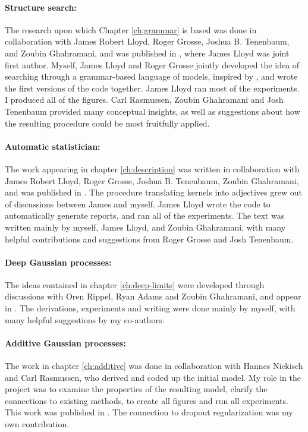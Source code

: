 \paragraph{Structure search:}
The research upon which Chapter \ref{ch:grammar} is based was done in collaboration with James Robert Lloyd, Roger Grosse, Joshua B. Tenenbaum, and Zoubin Ghahramani, and was published in \citep{DuvLloGroetal13}, where James Lloyd was joint first author.
Myself, James Lloyd and Roger Grosse jointly developed the idea of searching through a grammar-based language of \gp{} models, inspired by \citet{grosse2012exploiting}, and wrote the first versions of the code together.
James Lloyd ran most of the experiments.
I produced all of the figures.
Carl Rasmussen, Zoubin Ghahramani and Josh Tenenbaum provided many conceptual insights, as well as suggestions about how the resulting procedure could be most fruitfully applied.

\paragraph{Automatic statistician:} The work appearing in chapter \ref{ch:description} was written in collaboration with James Robert Lloyd, Roger Grosse, Joshua B. Tenenbaum, Zoubin Ghahramani, and was published in \citep{LloDuvGroetal14}.
The procedure translating kernels into adjectives grew out of discussions between James and myself.
James Lloyd wrote the code to automatically generate reports, and ran all of the experiments.
The text was written mainly by myself, James Lloyd, and Zoubin Ghahramani, with many helpful contributions and suggestions from Roger Grosse and Josh Tenenbaum.

\paragraph{Deep Gaussian processes:}
The ideas contained in chapter \ref{ch:deep-limits} were developed through discussions with Oren Rippel, Ryan Adams and Zoubin Ghahramani, and appear in \citep{DuvRipAdaGha14}.  The derivations, experiments and writing were done mainly by myself, with many helpful suggestions by my co-authors.

\paragraph{Additive Gaussian processes:}
The work in chapter \ref{ch:additive} was done in collaboration with Hannes Nickisch and Carl Rasmussen, who derived and coded up the initial model.
My role in the project was to examine the properties of the resulting model, clarify the connections to existing methods, to create all figures and run all experiments.
This work was published in \citep{duvenaud2011additive11}.
The connection to dropout regularization was my own contribution.

